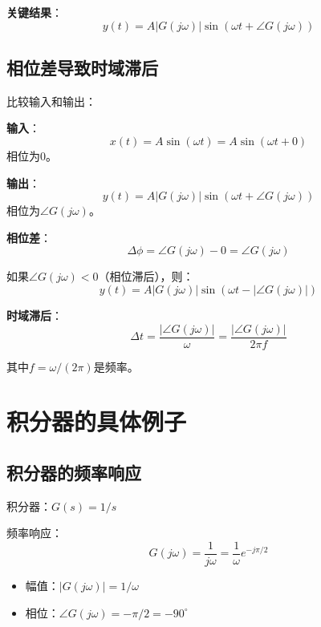 \documentclass[12pt,a4paper]{article}
\begin{document}
\textbf{关键结果}：
\begin{equation}
y(t) = A|G(j\omega)|\sin(\omega t + \angle G(j\omega))
\end{equation}

\subsection{相位差导致时域滞后}

比较输入和输出：

\textbf{输入}：
\begin{equation}
x(t) = A\sin(\omega t) = A\sin(\omega t + 0)
\end{equation}
相位为$0$。

\textbf{输出}：
\begin{equation}
y(t) = A|G(j\omega)|\sin(\omega t + \angle G(j\omega))
\end{equation}
相位为$\angle G(j\omega)$。

\textbf{相位差}：
\begin{equation}
\Delta \phi = \angle G(j\omega) - 0 = \angle G(j\omega)
\end{equation}

如果$\angle G(j\omega) < 0$（相位滞后），则：
\begin{equation}
y(t) = A|G(j\omega)|\sin(\omega t - |\angle G(j\omega)|)
\end{equation}

\textbf{时域滞后}：
\begin{equation}
\Delta t = \frac{|\angle G(j\omega)|}{\omega} = \frac{|\angle G(j\omega)|}{2\pi f}
\end{equation}

其中$f = \omega/(2\pi)$是频率。

\section{积分器的具体例子}

\subsection{积分器的频率响应}

积分器：$G(s) = 1/s$

频率响应：
\begin{equation}
G(j\omega) = \frac{1}{j\omega} = \frac{1}{\omega} e^{-j\pi/2}
\end{equation}

\begin{itemize}
\item 幅值：$|G(j\omega)| = 1/\omega$
\item 相位：$\angle G(j\omega) = -\pi/2 = -90^\circ$
\end{itemize}
\end{document}
